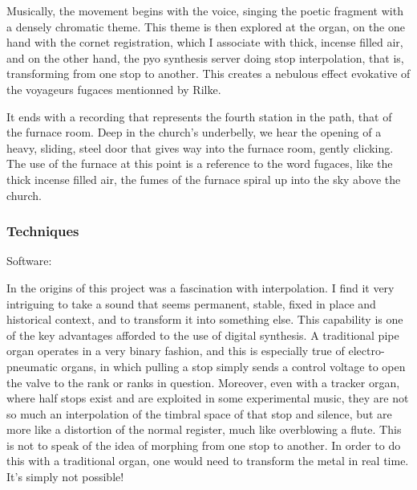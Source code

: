 \documentclass[12pt,twoside,maitrise]{dms}
\theoremstyle{definition}
\begin{document}
Musically, the movement begins with the voice, singing the poetic fragment with a densely chromatic theme.
This theme is then explored at the organ, on the one hand with the cornet registration, which I associate with thick, incense filled air, and on the other hand, the pyo synthesis server doing stop interpolation, that is, transforming from one stop to another.
This creates a nebulous effect evokative of the voyageurs fugaces mentionned by Rilke.

It ends with a recording that represents the fourth station in the path, that of the furnace room.
Deep in the church's underbelly, we hear the opening of a heavy, sliding, steel door that gives way into the furnace room, gently clicking.
The use of the furnace at this point is a reference to the word fugaces, like the thick incense filled air, the fumes of the furnace spiral up into the sky above the church.

\subsubsection{Techniques}

Software:

In the origins of this project was a fascination with interpolation.
I find it very intriguing to take a sound that seems permanent, stable, fixed in place and historical context, and to transform it into something else.
This capability is one of the key advantages afforded to the use of digital synthesis.
A traditional pipe organ operates in a very binary fashion, and this is especially true of electro-pneumatic organs, in which pulling a stop simply sends a control voltage to open the valve to the rank or ranks in question.
Moreover, even with a tracker organ, where half stops exist and are exploited in some experimental music, they are not so much an interpolation of the timbral space of that stop and silence, but are more like a distortion of the normal register, much like overblowing a flute.
This is not to speak of the idea of morphing from one stop to another.
In order to do this with a traditional organ, one would need to transform the metal in real time.
It's simply not possible!
\end{document}

